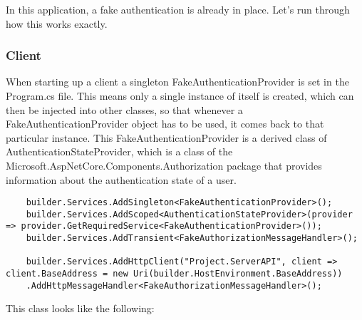 In this application, a fake authentication is already in place. Let's run through how this works exactly.

\subsubsection{Client}

When starting up a client a singleton FakeAuthenticationProvider is set in the Program.cs file. This means only a single instance of itself is created, which can then be injected into other classes, so that whenever a FakeAuthenticationProvider object has to be used, it comes back to that particular instance. This FakeAuthenticationProvider is a derived class of AuthenticationStateProvider, which is a class of the Microsoft.AspNetCore.Components.Authorization package that provides information about the authentication state of a user.

\begin{verbatim}
    builder.Services.AddSingleton<FakeAuthenticationProvider>();
    builder.Services.AddScoped<AuthenticationStateProvider>(provider => provider.GetRequiredService<FakeAuthenticationProvider>());
    builder.Services.AddTransient<FakeAuthorizationMessageHandler>();
    
    builder.Services.AddHttpClient("Project.ServerAPI", client => client.BaseAddress = new Uri(builder.HostEnvironment.BaseAddress))
    .AddHttpMessageHandler<FakeAuthorizationMessageHandler>();
\end{verbatim}

This class looks like the following:

